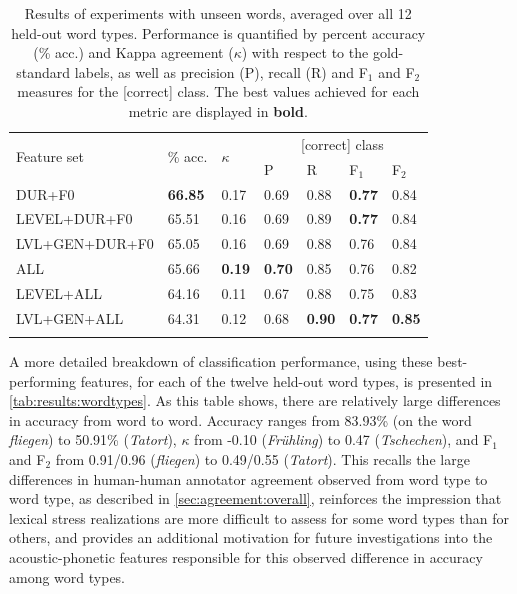 	
	\begin{table}
			\centering
			\caption[Results of experiments with unseen words]{Results of experiments with unseen words, averaged over all 12 held-out word types.
			Performance is quantified by percent accuracy (\% acc.) and Kappa agreement ($\kappa$) with respect to the gold-standard labels, as well as precision (P), recall (R) and F$_1$ and F$_2$ measures for the [correct] class. 
			The best values achieved for each metric are displayed in \textbf{bold}.
			}
			\begin{tabularx}{.8\textwidth}{lXXXXXX}		
			\toprule
			\multirow{2}{*}{Feature set} & \multirow{2}{*}{\% acc.} & \multirow{2}{*}{$\kappa$} & \multicolumn{4}{c}{[correct] class} \\
			\cmidrule(lr){4-7}
			& & & P & R & F$_1$ & F$_2$ \\
			\midrule
DUR+F0	&	\textbf{66.85}	&	0.17	&	0.69	&	0.88	&	\textbf{0.77}	&	0.84	\\
{LEVEL+DUR+F0}	&	65.51	&	0.16	&	0.69	&	0.89	&	\textbf{0.77}	&	0.84	\\
{LVL+GEN+DUR+F0}	&	65.05	&	0.16	&	0.69	&	0.88	&	0.76	&	0.84	\\
			\midrule								
ALL	&	65.66	&	\textbf{0.19}	&	\textbf{0.70}	&	0.85	&	0.76	&	0.82	\\
{LEVEL+ALL}	&	64.16	&	0.11	&	0.67	&	0.88	&	0.75	&	0.83	\\
{LVL+GEN+ALL}	&	64.31	&	0.12	&	0.68	&	\textbf{0.90}	&	\textbf{0.77}	&	\textbf{0.85}	\\

		\bottomrule
			\label{tab:results:words}
			\end{tabularx}
		\end{table}	
	
	
	A more detailed breakdown of classification performance, using these best-performing features, for each of the twelve held-out word types, is presented in \cref{tab:results:wordtypes}. As this table shows, there are relatively large differences in accuracy from word to word. Accuracy ranges from 83.93\% (on the word \textit{fliegen}) to 50.91\% (\textit{Tatort}), $\kappa$ from -0.10 (\textit{Fr\"uhling}) to 0.47 (\textit{Tschechen}), and F$_1$ and F$_2$ from 0.91/0.96 (\textit{fliegen}) to 0.49/0.55 (\textit{Tatort}). This recalls the large differences in human-human annotator agreement observed from word type to word type, as described in \cref{sec:agreement:overall}, reinforces the impression that lexical stress realizations are more difficult to assess for some word types than for others, and provides an additional motivation for future investigations into the acoustic-phonetic features responsible for this observed difference in accuracy among word types. %
	
